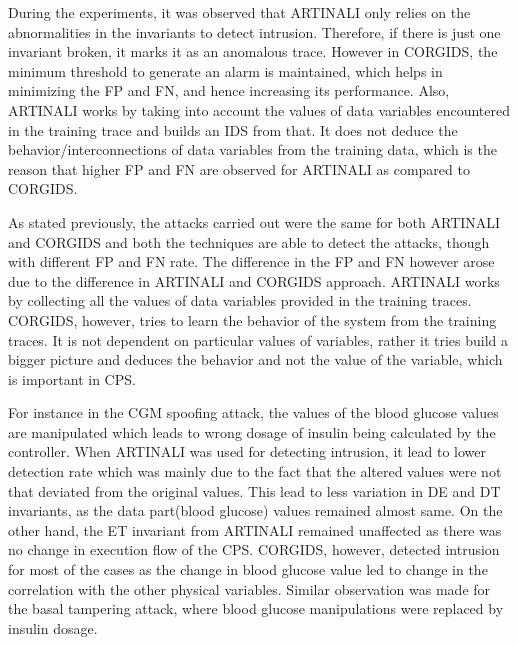 \begin{table}
\centering
  \caption{Results of intrusion detection by \ac{CORGIDS} for targeted attack on \ac{SAP} platform}
  \label{tab:CORGIDS_SAP_targeted}
\end{table}



During the experiments, it was observed that ARTINALI only relies on the abnormalities in the invariants to detect intrusion. Therefore, if there is just one invariant broken, it marks it as an anomalous trace. However in \ac{CORGIDS}, the minimum threshold to generate an alarm is maintained, which helps in minimizing the \ac{FP} and \ac{FN}, and hence increasing its performance. Also, ARTINALI works by taking into account the values of data variables encountered in the training trace and builds an \ac{IDS} from that. It does not deduce the behavior/interconnections of data variables from the training data, which is the reason that higher \ac{FP} and \ac{FN} are observed for ARTINALI as compared to \ac{CORGIDS}.

As stated previously, the attacks carried out were the same for both ARTINALI and \ac{CORGIDS} and both the techniques are able to detect the attacks, though with different \ac{FP} and \ac{FN} rate. The difference in the \ac{FP} and \ac{FN} however arose due to the difference in ARTINALI and \ac{CORGIDS} approach. ARTINALI works by collecting all the values of data variables provided in the training traces. \ac{CORGIDS}, however, tries to learn the behavior of the system from the training traces. It is not dependent on particular values of variables, rather it tries build a bigger picture and deduces the behavior and not the value of the variable, which is important in \ac{CPS}. 

For instance in the \ac{CGM} spoofing attack, the values of the blood glucose values are manipulated which leads to wrong dosage of insulin being calculated by the controller. When ARTINALI was used for detecting intrusion, it lead to lower detection rate which was mainly due to the fact that the altered values were not that deviated from the original values. This lead to less variation in D\textbar E and D\textbar T invariants, as the data part(blood glucose) values remained almost same. On the other hand, the E\textbar T invariant from ARTINALI remained unaffected as there was no change in execution flow of the \ac{CPS}. \ac{CORGIDS}, however, detected intrusion for most of the cases as the change in blood glucose value led to change in the correlation with the other physical variables. Similar observation was made for the basal tampering attack, where blood glucose manipulations were replaced by insulin dosage.


